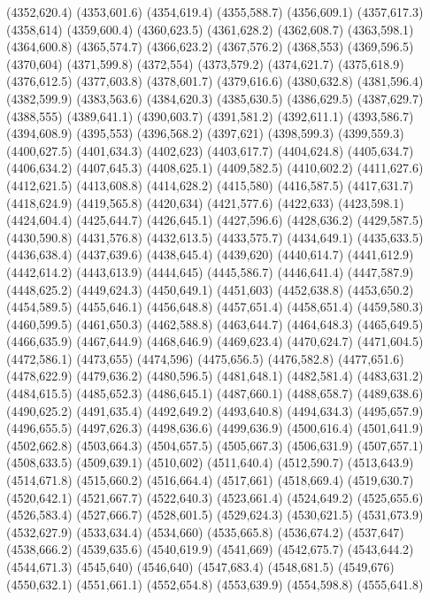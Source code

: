 (4352,620.4)
(4353,601.6)
(4354,619.4)
(4355,588.7)
(4356,609.1)
(4357,617.3)
(4358,614)
(4359,600.4)
(4360,623.5)
(4361,628.2)
(4362,608.7)
(4363,598.1)
(4364,600.8)
(4365,574.7)
(4366,623.2)
(4367,576.2)
(4368,553)
(4369,596.5)
(4370,604)
(4371,599.8)
(4372,554)
(4373,579.2)
(4374,621.7)
(4375,618.9)
(4376,612.5)
(4377,603.8)
(4378,601.7)
(4379,616.6)
(4380,632.8)
(4381,596.4)
(4382,599.9)
(4383,563.6)
(4384,620.3)
(4385,630.5)
(4386,629.5)
(4387,629.7)
(4388,555)
(4389,641.1)
(4390,603.7)
(4391,581.2)
(4392,611.1)
(4393,586.7)
(4394,608.9)
(4395,553)
(4396,568.2)
(4397,621)
(4398,599.3)
(4399,559.3)
(4400,627.5)
(4401,634.3)
(4402,623)
(4403,617.7)
(4404,624.8)
(4405,634.7)
(4406,634.2)
(4407,645.3)
(4408,625.1)
(4409,582.5)
(4410,602.2)
(4411,627.6)
(4412,621.5)
(4413,608.8)
(4414,628.2)
(4415,580)
(4416,587.5)
(4417,631.7)
(4418,624.9)
(4419,565.8)
(4420,634)
(4421,577.6)
(4422,633)
(4423,598.1)
(4424,604.4)
(4425,644.7)
(4426,645.1)
(4427,596.6)
(4428,636.2)
(4429,587.5)
(4430,590.8)
(4431,576.8)
(4432,613.5)
(4433,575.7)
(4434,649.1)
(4435,633.5)
(4436,638.4)
(4437,639.6)
(4438,645.4)
(4439,620)
(4440,614.7)
(4441,612.9)
(4442,614.2)
(4443,613.9)
(4444,645)
(4445,586.7)
(4446,641.4)
(4447,587.9)
(4448,625.2)
(4449,624.3)
(4450,649.1)
(4451,603)
(4452,638.8)
(4453,650.2)
(4454,589.5)
(4455,646.1)
(4456,648.8)
(4457,651.4)
(4458,651.4)
(4459,580.3)
(4460,599.5)
(4461,650.3)
(4462,588.8)
(4463,644.7)
(4464,648.3)
(4465,649.5)
(4466,635.9)
(4467,644.9)
(4468,646.9)
(4469,623.4)
(4470,624.7)
(4471,604.5)
(4472,586.1)
(4473,655)
(4474,596)
(4475,656.5)
(4476,582.8)
(4477,651.6)
(4478,622.9)
(4479,636.2)
(4480,596.5)
(4481,648.1)
(4482,581.4)
(4483,631.2)
(4484,615.5)
(4485,652.3)
(4486,645.1)
(4487,660.1)
(4488,658.7)
(4489,638.6)
(4490,625.2)
(4491,635.4)
(4492,649.2)
(4493,640.8)
(4494,634.3)
(4495,657.9)
(4496,655.5)
(4497,626.3)
(4498,636.6)
(4499,636.9)
(4500,616.4)
(4501,641.9)
(4502,662.8)
(4503,664.3)
(4504,657.5)
(4505,667.3)
(4506,631.9)
(4507,657.1)
(4508,633.5)
(4509,639.1)
(4510,602)
(4511,640.4)
(4512,590.7)
(4513,643.9)
(4514,671.8)
(4515,660.2)
(4516,664.4)
(4517,661)
(4518,669.4)
(4519,630.7)
(4520,642.1)
(4521,667.7)
(4522,640.3)
(4523,661.4)
(4524,649.2)
(4525,655.6)
(4526,583.4)
(4527,666.7)
(4528,601.5)
(4529,624.3)
(4530,621.5)
(4531,673.9)
(4532,627.9)
(4533,634.4)
(4534,660)
(4535,665.8)
(4536,674.2)
(4537,647)
(4538,666.2)
(4539,635.6)
(4540,619.9)
(4541,669)
(4542,675.7)
(4543,644.2)
(4544,671.3)
(4545,640)
(4546,640)
(4547,683.4)
(4548,681.5)
(4549,676)
(4550,632.1)
(4551,661.1)
(4552,654.8)
(4553,639.9)
(4554,598.8)
(4555,641.8)
